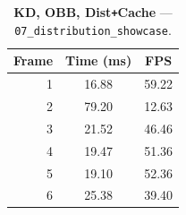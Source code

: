 \begin{table}[htbp]
  \centering\small
  \setlength{\tabcolsep}{8pt}
  \begin{tabular}{@{}rcc@{}}
    \toprule
    \textbf{Frame} & \textbf{Time (ms)} & \textbf{FPS} \\
    \midrule
    1 & 16.88 & 59.22 \\
    2 & 79.20 & 12.63 \\
    3 & 21.52 & 46.46 \\
    4 & 19.47 & 51.36 \\
    5 & 19.10 & 52.36 \\
    6 & 25.38 & 39.40 \\
    \bottomrule
  \end{tabular}
  \caption{\textbf{KD, OBB, Dist\texttt{+}Cache} --- \texttt{07\_distribution\_showcase}.}
  \label{tab:rt-07-distribution-showcase-KD-OBB-DistCache}
\end{table}

